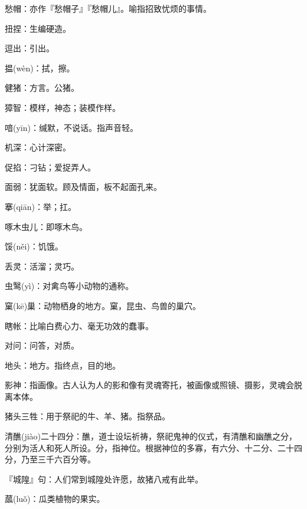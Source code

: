 \startbuffer[1174]
愁帽：亦作『愁帽子』『愁帽儿』。喻指招致忧烦的事情。
\stopbuffer


\startbuffer[1175]
扭捏：生编硬造。
\stopbuffer


\startbuffer[1176]
逗出：引出。
\stopbuffer


\startbuffer[1177]
揾(wèn)：拭，擦。
\stopbuffer


\startbuffer[1178]
健猪：方言。公猪。
\stopbuffer


\startbuffer[1179]
獐智：模样，神态；装模作样。
\stopbuffer


\startbuffer[1180]
喑(yīn)：缄默，不说话。指声音轻。
\stopbuffer


\startbuffer[1181]
机深：心计深密。
\stopbuffer


\startbuffer[1182]
促掐：刁钻；爱捉弄人。
\stopbuffer


\startbuffer[1183]
面弱：犹面软。顾及情面，板不起面孔来。
\stopbuffer


\startbuffer[1184]
搴(qiān)：举；扛。
\stopbuffer


\startbuffer[1185]
啄木虫儿：即啄木鸟。
\stopbuffer


\startbuffer[1186]
馁(něi)：饥饿。
\stopbuffer


\startbuffer[1187]
丢灵：活溜；灵巧。
\stopbuffer


\startbuffer[1188]
虫鹥(yì)：对禽鸟等小动物的通称。
\stopbuffer


\startbuffer[1189]
窠(kē)巢：动物栖身的地方。窠，昆虫、鸟兽的巢穴。
\stopbuffer


\startbuffer[1190]
瞎帐：比喻白费心力、毫无功效的蠢事。
\stopbuffer


\startbuffer[1191]
对问：问答，对质。
\stopbuffer


\startbuffer[1192]
地头：地方。指终点，目的地。
\stopbuffer


\startbuffer[1193]
影神：指画像。古人认为人的影和像有灵魂寄托，被画像或照镜、摄影，灵魂会脱离本体。
\stopbuffer


\startbuffer[1194]
猪头三牲：用于祭祀的牛、羊、猪。指祭品。
\stopbuffer


\startbuffer[1195]
清醮(jiào)二十四分：醮，道士设坛祈祷，祭祀鬼神的仪式，有清醮和幽醮之分，分别为活人和死人所设。分，指神位。根据神位的多寡，有六分、十二分、二十四分，乃至三千六百分等。
\stopbuffer


\startbuffer[1196]
『城隍』句：人们常到城隍处许愿，故猪八戒有此举。
\stopbuffer


\startbuffer[1197]
蓏(luǒ)：瓜类植物的果实。
\stopbuffer


